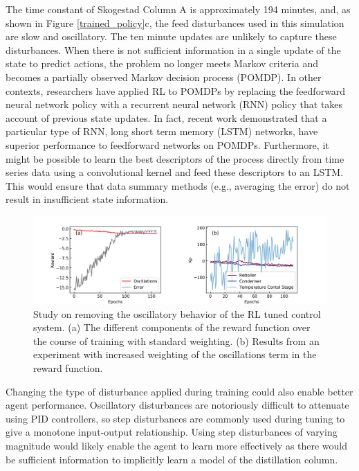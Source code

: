 The time constant of Skogestad Column A is approximately 194 minutes,\cite{Skogestad1988} and, as shown in Figure \ref{trained_policy}c, the feed disturbances used in this simulation are slow and oscillatory. The ten minute updates are unlikely to capture these disturbances. When there is not sufficient information in a single update of the state to predict actions, the problem no longer meets Markov criteria and becomes a partially observed Markov decision process (POMDP). In other contexts, researchers have applied RL to POMDPs by replacing the feedforward neural network policy with a recurrent neural network (RNN) policy that takes account of previous state updates.\cite{Bakker2002, Hausknecht2015} In fact, recent work demonstrated that a particular type of RNN, long short term memory (LSTM) networks, have superior performance to feedforward networks on POMDPs.\cite{openai2018} Furthermore, it might be possible to learn the best descriptors of the process directly from time series data using a convolutional kernel and feed these descriptors to an LSTM.\cite{Hausknecht2015, Badgwell2019} This would ensure that data summary methods (e.g., averaging the error) do not result in insufficient state information. 

\begin{figure}[t]
  \includegraphics[width=1.2\textwidth]{gfx/Chapter05/oscillations_study.png}
  \caption{Study on removing the oscillatory behavior of the RL tuned control system. (a) The different components of the reward function over the course of training with standard weighting. (b) Results from an experiment with increased weighting of the oscillations term in the reward function.}
  \label{reward_tradeoff}
\end{figure}

Changing the type of disturbance applied during training could also enable better agent performance. Oscillatory disturbances are notoriously difficult to attenuate using PID controllers, so step disturbances are commonly used during tuning to give a monotone input-output relationship.\cite{Astrom2006} Using step disturbances of varying magnitude would likely enable the agent to learn more effectively as there would be sufficient information to implicitly learn a model of the distillation column. 
 
